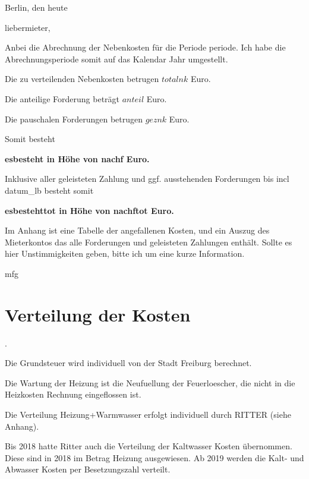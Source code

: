 \documentclass[12pt]{article}
\newcommand{\euro}{Euro}
\begin{document}
\hfill Berlin, den {{heute}}

{{liebermieter}},

\bigskip
\bigskip
\bigskip

Anbei die Abrechnung der Nebenkosten für die Periode {{periode}}.
Ich habe die Abrechnungsperiode somit auf das Kalendar Jahr umgestellt.

Die zu verteilenden Nebenkosten betrugen ${{totalnk}}$ \euro.

Die anteilige Forderung beträgt ${{anteil}}$ \euro.

Die pauschalen Forderungen betrugen ${{geznk}}$ \euro. 

Somit besteht

\bigskip

\begin{centering}
{ \bf {{esbesteht}} in Höhe von {{nachf}} \euro.}
\end{centering}

\bigskip


Inklusive aller geleisteten Zahlung und ggf. ausstehenden Forderungen bis incl {{datum_lb}} besteht somit

\bigskip

\begin{centering}
{ \bf {{esbestehttot}} in Höhe von {{nachftot}} \euro.}
\end{centering}

\bigskip
Im Anhang ist eine Tabelle der angefallenen Kosten, und ein Auszug des 
Mieterkontos
das alle Forderungen und geleisteten Zahlungen enthält.
Sollte es hier Unstimmigkeiten geben, 
bitte ich um eine kurze Information.

\bigskip
\bigskip
\bigskip

{{mfg}}

\vfill
\eject

\section*{Verteilung der Kosten}. 

Die Grundsteuer wird individuell von der Stadt Freiburg berechnet.

Die Wartung der Heizung ist die Neufuellung der Feuerloescher, die nicht in
die Heizkosten Rechnung eingeflossen ist.

Die Verteilung Heizung+Warmwasser erfolgt individuell durch RITTER (siehe Anhang). 

Bis 2018 hatte Ritter auch die Verteilung der Kaltwasser Kosten übernommen. 
Diese sind in 2018 im Betrag Heizung ausgewiesen.
Ab 2019 werden die Kalt- und Abwasser Kosten per Besetzungszahl verteilt.
\end{document}
